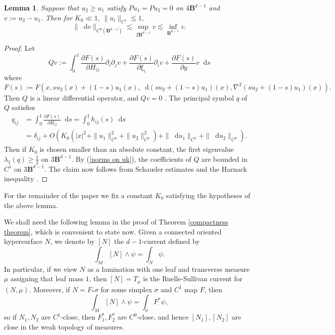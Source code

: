 \documentclass[reqno,11pt]{amsart}
\newcommand{\Ball}{\mathbf{B}}
\newcommand*\dif{\mathop{}\!\mathrm{d}}
\newtheorem{lemma}[theorem]{Lemma}
\theoremstyle{definition}
\numberwithin{equation}{section}
\begin{document}
\begin{lemma}
Suppose that $u_2 \geq u_1$ satisfy $Pu_1 = Pu_2 = 0$ on $4\Ball^{d - 1}$ and $v := u_2 - u_1$.
Then for $K_0 \ll 1$, $\|u_i\|_{C^1} \lesssim 1$, 
\begin{equation}\label{Schauder Harnack}
	\|\dif v\|_{C^0(\Ball^{d - 1})} \lesssim \sup_{2\Ball^{d - 1}} v \lesssim \inf_{\Ball^{d - 1}} v.
\end{equation}
\end{lemma}
\begin{proof}
Let
$$Qv := \int_0^1 \frac{\partial F(s)}{\partial H_{ij}} \partial_i \partial_j v + \frac{\partial F(s)}{\partial \xi_i} \partial_i v + \frac{\partial F(s)}{\partial y} v \dif s$$
where 
$$F(s) := F(x, su_2(x) + (1 - s)u_1(x), \dif(su_2 + (1 - s) u_1)(x), \nabla^2(su_2 + (1 - s)u_1)(x)).$$
Then $Q$ is a linear differential operator, and $Qv = 0$ \cite[(7.25)]{colding2011course}.
The principal symbol $q$ of $Q$ satisfies
\begin{align*}
q_{ij} &= \int_0^1 \frac{\partial F(s)}{\partial H_{ij}} \dif s = \int_0^1 h_{ij}(s) \dif s \\
&= \delta_{ij} + O(K_0(|x|^2 + \|u_1\|_{C^0}^2 + \|u_2\|_{C^0}^2) + \|\dif u_1\|_{C^0} + \|\dif u_2\|_{C^0}).
\end{align*}
Then if $K_0$ is chosen smaller than an absolute constant, the first eigenvalue $\lambda_1(q) \geq \frac{1}{2}$ on $3\Ball^{d - 1}$.
By (\ref{norms on uk}), the coefficients of $Q$ are bounded in $C^1$ on $3\Ball^{d - 1}$.
The claim now follows from Schauder estimates \cite[Theorem 6.2]{gilbarg2015elliptic} and the Harnack inequality \cite[Corollary 9.25]{gilbarg2015elliptic}.
\end{proof}

For the remainder of the paper we fix a constant $K_0$ satisfying the hypotheses of the above lemma.

We shall need the following lemma in the proof of Theorem \ref{compactness theorem}, which is convenient to state now.
Given a connected oriented hypersurface $N$, we denote by $[N]$ the $d-1$-current defined by 
$$\int_M [N] \wedge \psi = \int_N \psi.$$
In particular, if we view $N$ as a lamination with one leaf and transverse measure $\mu$ assigning that leaf mass $1$, then $[N] = T_\mu$ is the Ruelle-Sullivan current for $(N, \mu)$.
Moreover, if $N = F_* \sigma$ for some simplex $\sigma$ and $C^1$ map $F$, then 
$$\int_M [N] \wedge \psi = \int_\sigma F^* \psi,$$
so if $N_1, N_2$ are $C^1$-close, then $F_1^*, F_2^*$ are $C^0$-close, and hence $[N_1], [N_2]$ are close in the weak topology of measures.
\end{document}
